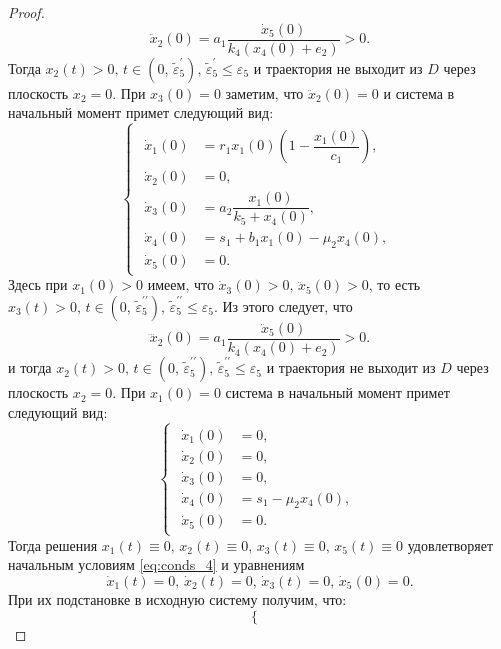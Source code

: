 \documentclass[14pt,a4paper]{extarticle}
\begin{document}
\begin{proof}
		\[\ddot{x}_2(0) = a_1\dfrac{\dot{x}_5(0)}{k_4(x_4(0)+e_2)} > 0.\]
		Тогда $x_2(t)>0,\, t\in(0,\, \tilde{\varepsilon}^{\prime}_5),\,\tilde{\varepsilon}^{\prime}_5\le\varepsilon_5$ и траектория не выходит из $D$ через плоскость $x_2=0$. При $x_3(0)=0$ заметим, что $\ddot{x}_2(0)=0$ и система в начальный момент примет следующий вид:
		\begin{equation*}
			\begin{cases}
				\begin{aligned}
					\dot{x}_1(0) &= r_1x_1(0)\left(1-\dfrac{x_1(0)}{c_1}\right),\\
					\dot{x}_2(0) &= 0,\\
					\dot{x}_3(0) &= a_2\dfrac{x_1(0)}{k_5+x_4(0)},\\
					\dot{x}_4(0) &= s_1 + b_1x_1(0)-\mu_2x_4(0),\\
					\dot{x}_5(0) &= 0.
				\end{aligned}
			\end{cases}
		\end{equation*} 
		Здесь при $x_1(0)>0$ имеем, что $\dot{x}_3(0)>0,\,\ddot{x}_5(0)>0$, то есть $x_3(t)>0,\, t\in(0,\, \tilde{\varepsilon}^{\prime\prime}_5),\,\tilde{\varepsilon}^{\prime\prime}_5\le\varepsilon_5$. Из этого следует, что
		\[\dddot{x}_2(0) = a_1\dfrac{\ddot{x}_5(0)}{k_4(x_4(0)+e_2)}>0.\]
		и тогда $x_2(t)>0,\, t\in(0,\, \tilde{\varepsilon}^{\prime\prime}_5),\,\tilde{\varepsilon}^{\prime\prime}_5\le\varepsilon_5$ и траектория не выходит из $D$ через плоскость $x_2=0$. При $x_1(0)=0$ система в начальный момент примет следующий вид:
		\begin{equation*}
			\begin{cases}
				\begin{aligned}
					\dot{x}_1(0) &= 0,\\
					\dot{x}_2(0) &= 0,\\
					\dot{x}_3(0) &= 0,\\
					\dot{x}_4(0) &= s_1 - \mu_2x_4(0),\\
					\dot{x}_5(0) &= 0.
				\end{aligned}
			\end{cases}
		\end{equation*}
		Тогда решения $x_1(t)\equiv0,\, x_2(t)\equiv0,\, x_3(t)\equiv0,\, x_5(t)\equiv0$ удовлетворяет начальным условиям \ref{eq:conds_4} и уравнениям 
		\[\dot{x}_1(t)=0,\, \dot{x}_2(t)=0,\, \dot{x}_3(t)=0,\, \dot{x}_5(0)=0.\] 
		При их подстановке в исходную систему получим, что:
		\begin{equation*}
			\begin{cases}

\end{cases}
\end{equation*}
\end{proof}
\end{document}
